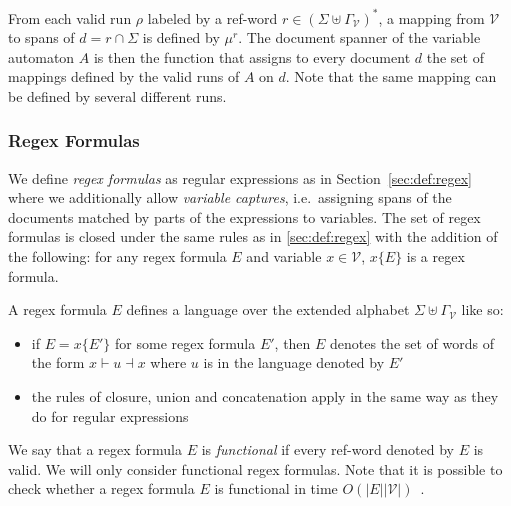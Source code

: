\documentclass[12px]{article}
\begin{document}
        From each valid run $\rho$ labeled by a ref-word $r \in {(\Sigma \uplus
        \Gamma_\mathcal{V})}^*$, a mapping from $\mathcal{V}$ to spans of $d =
        r \cap \Sigma$ is defined by $\mu^r$. The document spanner of the
        variable automaton $A$ is then the function that assigns to every
        document $d$ the set of mappings defined by the valid runs of $A$ on
        $d$. Note that the same mapping can be defined by several different
        runs.


      \subsubsection{Regex Formulas}

        We define \emph{regex formulas} as regular expressions as in
        Section~\ref{sec:def:regex} where we additionally allow \emph{variable
        captures}, i.e.\ assigning spans of the documents matched by parts of
        the expressions to variables. The set of regex formulas is closed under
        the same rules as in \ref{sec:def:regex} with the addition of the
        following: for any regex formula $E$ and variable $x \in \mathcal{V}$,
        $x\{E\}$ is a regex formula.

        A regex formula $E$ defines a language over the extended alphabet $\Sigma
        \uplus \Gamma_\mathcal{V}$ like so:
          \begin{itemize}
            \item if $E = x\{E'\}$ for some regex formula $E'$, then $E$ denotes
              the set of words of the form $x{\vdash} u {\dashv}x$ where $u$ is
              in the language denoted by $E'$
            \item the rules of closure, union and concatenation apply in the same
              way as they do for regular expressions
          \end{itemize}

        We say that a regex formula $E$ is \textit{functional} if every
        ref-word denoted by $E$ is valid. We will only consider functional
        regex formulas. Note that it is possible to check whether a regex
        formula $E$ is functional in time $O(|E|
        |\mathcal{V}|)$~\cite{peterfreund}.
\end{document}
